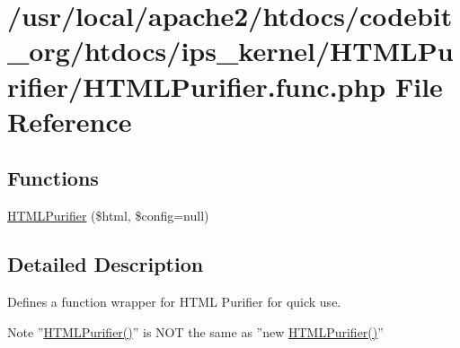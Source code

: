 \hypertarget{_h_t_m_l_purifier_8func_8php}{\section{/usr/local/apache2/htdocs/codebit\-\_\-org/htdocs/ips\-\_\-kernel/\-H\-T\-M\-L\-Purifier/\-H\-T\-M\-L\-Purifier.func.\-php File Reference}
\label{_h_t_m_l_purifier_8func_8php}
}
\subsection*{Functions}
\begin{DoxyCompactItemize}
\item 
\hyperlink{_h_t_m_l_purifier_8func_8php_a9cbaed512b3193663ebf1f6850f1e654}{H\-T\-M\-L\-Purifier} (\$html, \$config=null)
\end{DoxyCompactItemize}


\subsection{Detailed Description}
Defines a function wrapper for H\-T\-M\-L Purifier for quick use. \begin{DoxyNote}{Note}
''\hyperlink{_h_t_m_l_purifier_8func_8php_a9cbaed512b3193663ebf1f6850f1e654}{H\-T\-M\-L\-Purifier()}'' is N\-O\-T the same as ''new \hyperlink{_h_t_m_l_purifier_8func_8php_a9cbaed512b3193663ebf1f6850f1e654}{H\-T\-M\-L\-Purifier()}'' 
\end{DoxyNote}


